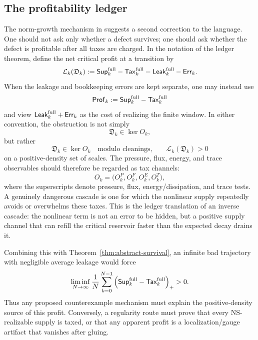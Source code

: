 \documentclass[11pt]{article}
\numberwithin{equation}{section}
\newcommand{\Supp}{\mathsf{Sup}}
\newcommand{\Tax}{\mathsf{Tax}}
\newcommand{\Leak}{\mathsf{Leak}}
\newcommand{\Err}{\mathsf{Err}}
\newcommand{\pos}[1]{\left(#1\right)_+}
\newcommand{\calL}{\mathcal L}
\newcommand{\Prof}{\mathsf{Prof}}
\begin{document}
\subsection*{The profitability ledger}

The norm-growth mechanism in \cite{PalasekNormGrowth2025} suggests a second correction to the language.  One should not ask only whether a defect survives; one should ask whether the defect is profitable after all taxes are charged.  In the notation of the ledger theorem, define the net critical profit at a transition by
\begin{equation}\label{eq:net-profit}
    \calL_k(\mathfrak D_k)
    :=
    \Supp_k^{\rm full}
    -\Tax_k^{\rm full}
    -\Leak_k^{\rm full}
    -\Err_k.
\end{equation}
When the leakage and bookkeeping errors are kept separate, one may instead use
\[
    \Prof_k:=\Supp_k^{\rm full}-\Tax_k^{\rm full}
\]
and view $\Leak_k^{\rm full}+\Err_k$ as the cost of realizing the finite window.  In either convention, the obstruction is not simply
\[
    \mathfrak D_k\in \ker O_k,
\]
but rather
\begin{equation}\label{eq:profitable-invisible}
    \mathfrak D_k\in \ker O_k\quad\text{modulo cleanings,}
    \qquad
    \calL_k(\mathfrak D_k)>0
\end{equation}
on a positive-density set of scales.  The pressure, flux, energy, and trace observables should therefore be regarded as tax channels:
\begin{equation}\label{eq:tax-observable-map}
    O_k
    =
    \bigl(O_k^P,O_k^F,O_k^E,O_k^T\bigr),
\end{equation}
where the superscripts denote pressure, flux, energy/dissipation, and trace tests.  A genuinely dangerous cascade is one for which the nonlinear supply repeatedly avoids or overwhelms these taxes.  This is the ledger translation of an inverse cascade: the nonlinear term is not an error to be hidden, but a positive supply channel that can refill the critical reservoir faster than the expected decay drains it.

Combining this with Theorem~\ref{thm:abstract-survival}, an infinite bad trajectory with negligible average leakage would force
\begin{equation}\label{eq:average-profitable-scales}
    \liminf_{N\to\infty}
    \frac1N\sum_{k=0}^{N-1}
    \pos{\Supp_k^{\rm full}-\Tax_k^{\rm full}}
    >0.
\end{equation}
Thus any proposed counterexample mechanism must explain the positive-density source of this profit.  Conversely, a regularity route must prove that every NS-realizable supply is taxed, or that any apparent profit is a localization/gauge artifact that vanishes after gluing.
\end{document}
